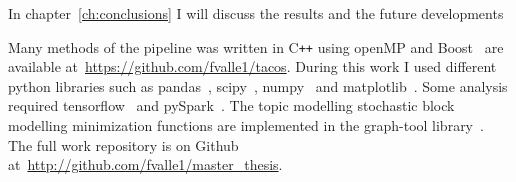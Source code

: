 In chapter~\ref{ch:conclusions} I will discuss the results and the future 
developments

Many methods of the pipeline was written in C\texttt{++} using  openMP and Boost~\cite{siek2002boost} are available at~\url{https://github.com/fvalle1/tacos}.
During this work I used different python libraries such as 
pandas~\cite{mckinney2010data}, scipy~\cite{jones2014scipy}, numpy~\cite{oliphant2006guide} and 
matplotlib~\cite{hunter2007matplotlib}. Some analysis required tensorflow~\cite{tensorflow2015-whitepaper} 
and pySpark~\cite{Zaharia:2016:ASU:3013530.2934664}.
The topic modelling stochastic block modelling minimization functions are implemented in the graph-tool library~\cite{peixoto_graph-tool_2014}.
The full work repository is on Github at~\url{http://github.com/fvalle1/master_thesis}.